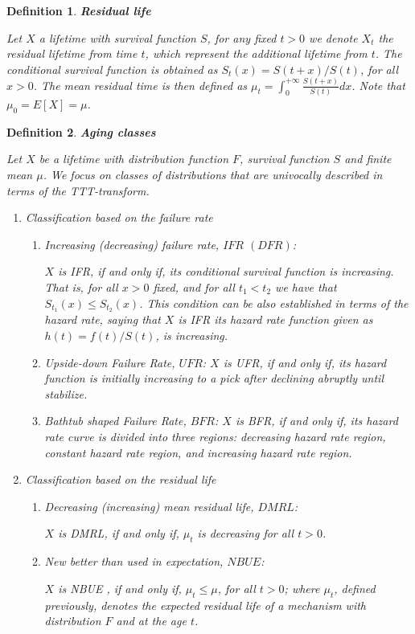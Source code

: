 \documentclass[preprint,12pt]{elsarticle}
\newtheorem{dfn}{{\sc Definition}}[section]
\begin{document}
\begin{dfn} {\bf Residual life}

\noindent Let $X$ a lifetime with survival function $S$, for any fixed $t>0$ we denote $X_t$ the residual lifetime from time $t$, which represent the additional lifetime from $t$. The conditional survival function is obtained as $S_t(x)=S(t+x)/S(t)$, for all $x >0$. The mean residual time is then defined as $\mu_t= \int_0^{+\infty} \frac{S(t+x)}{S(t)}dx$. Note that $\mu_0=E[X]=\mu$.
\end{dfn}


\begin{dfn} {\bf Aging classes}

\noindent Let $X$ be a lifetime with distribution function $F$, survival function $S$ and finite mean $\mu$. We focus on classes of distributions  that are univocally described in terms of the TTT-transform.

\begin{enumerate}
\item Classification based on the failure rate
\begin{enumerate}
\item Increasing (decreasing) failure rate, $IFR$ $(DFR)$:

\noindent $X$ is {\it IFR}, if and only if, its conditional survival function is increasing. That is, for all $x>0 $ fixed, and for all $t_1 < t_2$ we have that $S_{t_1}(x) \leq S_{t_2}(x)$. This condition can be also established in terms of the hazard rate, saying that $X$ is {\it IFR} its hazard rate function given as $h(t)=f(t)/S(t)$, is increasing.

\item Upside-down Failure Rate, $UFR$:
\noindent $X$ is {\it UFR},  if and only if, its hazard function is initially increasing to a pick after declining abruptly until stabilize.

\item Bathtub shaped Failure Rate, $BFR$:
\noindent $X$ is  {\it BFR}, if and only if, its  hazard rate curve is divided into three regions: decreasing hazard rate region, constant hazard rate region, and increasing hazard rate region.
\end{enumerate}

\item Classification based on the residual life
\begin{enumerate}
\item Decreasing (increasing) mean residual life, $DMRL$:

 \noindent $X$ is {\it DMRL}, if and only if, $\mu_t$ is decreasing for all $t>0$.

\item New better than used in expectation, $NBUE$:

 \noindent $X$  is {\it NBUE} , if and only if,  $\mu_t \leq  \mu$, for all $t>0$; where $\mu_t$, defined previously, denotes the expected residual life of a mechanism with distribution $F$ and at the age $t$.

\end{enumerate}
\end{enumerate}
\end{dfn}
\end{document}
